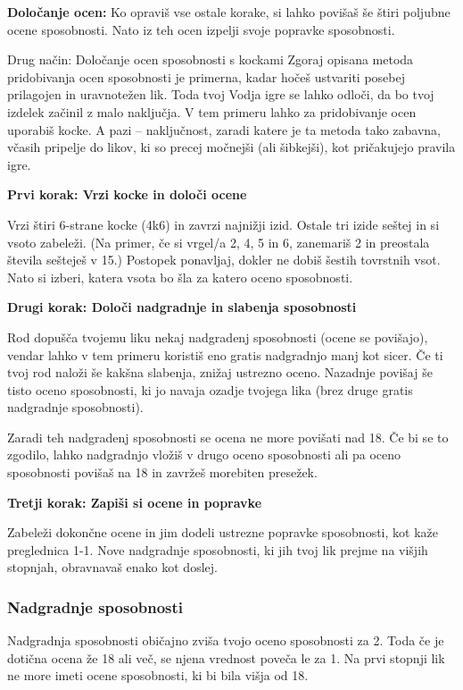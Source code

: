 \textbf{Določanje ocen:} Ko opraviš vse ostale korake, si lahko povišaš še štiri poljubne ocene sposobnosti. Nato iz teh ocen izpelji svoje popravke sposobnosti.

\begin{rpg-titlebox}{Drug način: Določanje ocen sposobnosti s kockami}
    Zgoraj opisana metoda pridobivanja ocen sposobnosti je primerna, kadar hočeš ustvariti posebej prilagojen in uravnotežen lik. Toda tvoj Vodja igre se lahko odloči, da bo tvoj izdelek začinil z malo naključja. V tem primeru lahko za pridobivanje ocen uporabiš kocke. A pazi -- naključnost, zaradi katere je ta metoda tako zabavna, včasih pripelje do likov, ki so precej močnejši (ali šibkejši), kot pričakujejo pravila igre.

    \textbf{Prvi korak: Vrzi kocke in določi ocene}

    Vrzi štiri 6-strane kocke (4k6) in zavrzi najnižji izid. Ostale tri izide seštej in si vsoto zabeleži. (Na primer, če si vrgel/a 2, 4, 5 in 6, zanemariš 2 in preostala števila sešteješ v 15.) Postopek ponavljaj, dokler ne dobiš šestih tovrstnih vsot. Nato si izberi, katera vsota bo šla za katero oceno sposobnosti.

    \textbf{Drugi korak: Določi nadgradnje in slabenja sposobnosti}

    Rod dopušča tvojemu liku nekaj nadgradenj sposobnosti (ocene se povišajo), vendar lahko v tem primeru koristiš eno gratis nadgradnjo manj kot sicer. Če ti tvoj rod naloži še kakšna slabenja, znižaj ustrezno oceno. Nazadnje povišaj še tisto oceno sposobnosti, ki jo navaja ozadje tvojega lika (brez druge gratis nadgradnje sposobnosti).

    Zaradi teh nadgradenj sposobnosti se ocena ne more povišati nad 18. Če bi se to zgodilo, lahko nadgradnjo vložiš v drugo oceno sposobnosti ali pa oceno sposobnosti povišaš na 18 in zavržeš morebiten presežek.

    \textbf{Tretji korak: Zapiši si ocene in popravke}

    Zabeleži dokončne ocene in jim dodeli ustrezne popravke sposobnosti, kot kaže preglednica 1-1. Nove nadgradnje sposobnosti, ki jih tvoj lik prejme na višjih stopnjah, obravnavaš enako kot doslej.
\end{rpg-titlebox}

\subsubsection{Nadgradnje sposobnosti}
Nadgradnja sposobnosti običajno zviša tvojo oceno sposobnosti za 2. Toda če je dotična ocena že 18 ali več, se njena vrednost poveča le za 1. Na prvi stopnji lik ne more imeti ocene sposobnosti, ki bi bila višja od 18.

